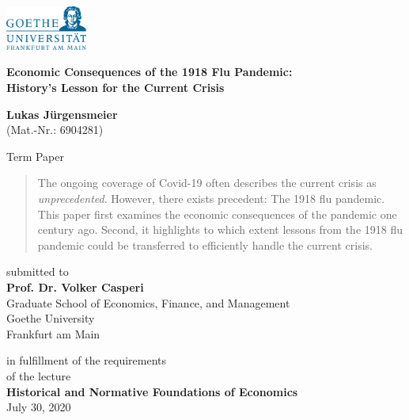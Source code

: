 \documentclass[12pt,a4paper]{article}
\begin{document}
\begin{center}
 \includegraphics[width=0.2\textwidth]{external/GU-Logo-blau-CMYK.eps} \vspace{1.5cm}
  
{\large{\bf Economic Consequences of the 1918 Flu Pandemic:\\
		History's Lesson for the Current Crisis}}

\textbf{Lukas J\"urgensmeier} \\
{\footnotesize (Mat.-Nr.: 6904281)}

  Term Paper \\\vspace{1.5cm}
  
  \begin{abstract}
  	The ongoing coverage of Covid-19 often describes the current crisis as \textit{unprecedented}.
  	However, there exists precedent: The 1918 flu pandemic.
  	This paper first examines the economic consequences of the pandemic one century ago.
  	Second, it highlights to which extent lessons from the 1918 flu pandemic could be transferred to efficiently handle the current crisis.
  \end{abstract} \vspace{1.5cm}
  
  submitted to \\\vspace{0.5cm}
  \textbf{Prof. Dr. Volker Casperi} \\
  Graduate School of Economics, Finance, and Management \\
  Goethe University \\
  Frankfurt am Main \vspace{1.5cm}
  
  in fulfillment of the requirements \\
  of the lecture \\\vspace{0.5cm}
  \textbf{Historical and Normative Foundations of Economics} \\\vspace{0.5cm}
  July 30, 2020
  
\end{center}


\pagebreak
\pagestyle{plain}
\tableofcontents
\pagebreak
\listoffigures
\listoftables
\newpage
{}
 
\end{document}
